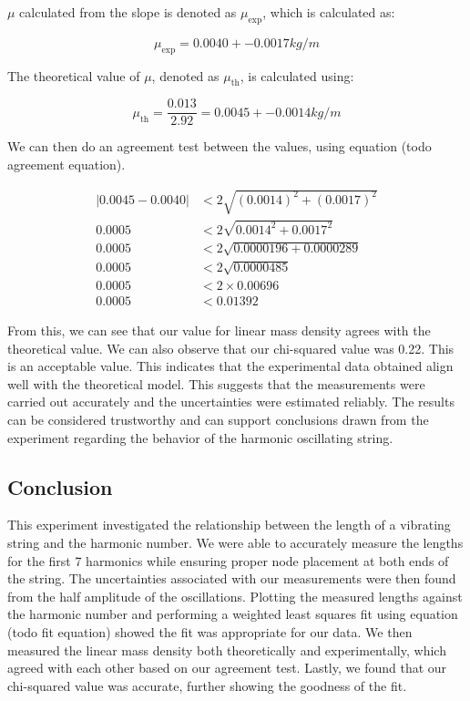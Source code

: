 \documentclass[11pt]{article}
\begin{document}
    $\mu$ calculated from the slope is denoted as $\mu_{\text{exp}}$, which is calculated as:
    
    \begin{equation}
    \mu_{\text{exp}} = 0.0040 +- 0.0017 kg/m
    \end{equation}
    
    The theoretical value of $\mu$, denoted as $\mu_{\text{th}}$, is calculated using:
    
    \begin{equation}
    \mu_{\text{th}} = \frac{0.013}{2.92} = 0.0045 +- 0.0014 kg/m
    \end{equation}

    We can then do an agreement test between the values, using equation (todo agreement equation).

    \begin{align*}
    |0.0045 - 0.0040| &< 2 \sqrt{(0.0014)^2 + (0.0017)^2} \\
    0.0005 &< 2 \sqrt{0.0014^2 + 0.0017^2} \\
    0.0005 &< 2 \sqrt{0.0000196 + 0.0000289} \\
    0.0005 &< 2 \sqrt{0.0000485} \\
    0.0005 &< 2 \times 0.00696 \\
    0.0005 &< 0.01392
    \end{align*}

    From this, we can see that our value for linear mass density agrees with the theoretical value. We can also observe that our chi-squared value was 0.22. This is an acceptable value. This indicates that the experimental data obtained align well with the theoretical model. This suggests that the measurements were carried out accurately and the uncertainties were estimated reliably. The results can be considered trustworthy and can support conclusions drawn from the experiment regarding the behavior of the harmonic oscillating string. 

    
    \subsection{Conclusion}\label{subsec:part_3_conclusion}
    This experiment investigated the relationship between the length of a vibrating string and the harmonic number. We were able to accurately measure the lengths for the first 7 harmonics while ensuring proper node placement at both ends of the string. The uncertainties associated with our measurements were then found from the half amplitude of the oscillations. Plotting the measured lengths against the harmonic number and performing a weighted least squares fit using equation (todo fit equation) showed the fit was appropriate for our data. We then measured the linear mass density both theoretically and experimentally, which agreed with each other based on our agreement test. Lastly, we found that our chi-squared value was accurate, further showing the goodness of the fit.
\end{document}
